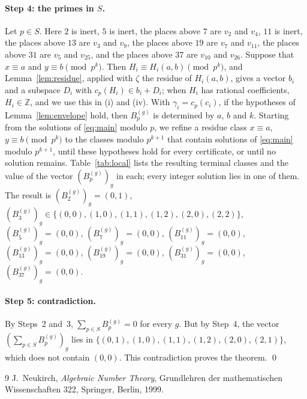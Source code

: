 \documentclass[11pt]{article}
\newcommand{\Z}{\mathbb{Z}}
\begin{document}
\paragraph{Step 4: the primes in $S$.} Let $p\in S$. Here $2$ is inert, $5$ is inert, the places above $7$ are $v_{2}$ and $v_{4}$, $11$ is inert, the places above $13$ are $v_{3}$ and $v_{9}$, the places above $19$ are $v_{7}$ and $v_{11}$, the places above $31$ are $v_{5}$ and $v_{25}$, and the places above $37$ are $v_{10}$ and $v_{26}$. Suppose that $x\equiv a$ and $y\equiv b\pmod{p^k}$. Then $H_i\equiv H_i(a,b)\pmod{p^k}$, and Lemma~\ref{lem:residue}, applied with $\zeta$ the residue of $H_i(a,b)$, gives a vector $b_i$ and a subspace $D_i$ with $c_p(H_i)\in b_i+D_i$; when $H_i$ has rational coefficients, $H_i\in\Z$, and we use this in (i) and (iv). With $\gamma_i=c_p(c_i)$, if the hypotheses of Lemma~\ref{lem:envelope} hold, then $B^{(g)}_p$ is determined by $a$, $b$ and $k$. Starting from the solutions of \eqref{eq:main} modulo $p$, we refine a residue class $x\equiv a$, $y\equiv b\pmod{p^k}$ to the classes modulo $p^{k+1}$ that contain solutions of \eqref{eq:main} modulo $p^{k+1}$, until these hypotheses hold for every certificate, or until no solution remains. Table~\ref{tab:local} lists the resulting terminal classes and the value of the vector $(B^{(g)}_p)_g$ in each; every integer solution lies in one of them. The result is $(B^{(g)}_{2})_g=(0,1)$, $(B^{(g)}_{3})_g\in\{(0,0),\allowbreak (1,0),\allowbreak (1,1),\allowbreak (1,2),\allowbreak (2,0),\allowbreak (2,2)\}$, $(B^{(g)}_{5})_g=(0,0)$, $(B^{(g)}_{7})_g=(0,0)$, $(B^{(g)}_{11})_g=(0,0)$, $(B^{(g)}_{13})_g=(0,0)$, $(B^{(g)}_{19})_g=(0,0)$, $(B^{(g)}_{31})_g=(0,0)$, $(B^{(g)}_{37})_g=(0,0)$.

\paragraph{Step 5: contradiction.} By Steps~2 and~3, $\sum_{p\in S}B^{(g)}_p=0$ for every $g$. But by Step~4, the vector $(\sum_{p\in S}B^{(g)}_p)_g$ lies in $\{(0,1),\allowbreak (1,0),\allowbreak (1,1),\allowbreak (1,2),\allowbreak (2,0),\allowbreak (2,1)\}$, which does not contain $(0,0)$. This contradiction proves the theorem.
\qed


\begin{thebibliography}{9}
 J.~Neukirch, \emph{Algebraic Number Theory}, Grundlehren der mathematischen Wissenschaften 322, Springer, Berlin, 1999.
\end{thebibliography}
\end{document}
